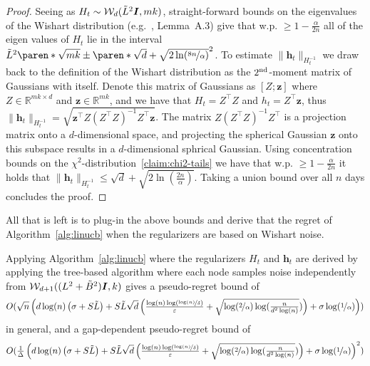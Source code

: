 \documentclass{article}
\renewcommand{\vec}[1]{\bm{#1}}
\newcommand{\Real}{\mathds{R}}
\DeclarePairedDelimiter{\paren}()
\providecommand\transp{\top}
\let\transpsymbol\transp
\renewcommand{\transp}[1]{#1^\transpsymbol}
\newcommand{\Wishart}{\mathcal{W}}
\newcommand{\Eye}[1][]{\bm{I}\notblank{#1}{_{{#1}\times{#1}}}{}}
\begin{document}
\begin{proof}
Seeing as $H_t\sim\Wishart_d(\tilde L^2 \Eye, mk)$, straight-forward bounds on the eigenvalues of the Wishart distribution (e.g.~\cite{SheffetPrivateApproxRegression2015}, Lemma~A.3) give that w.p. $\geq 1- \tfrac \alpha{2n}$ all of the eigen values of $H_t$ lie in the interval $\tilde L^2 \paren*{\sqrt{mk} \pm \paren*{\sqrt{d} + \sqrt{2\ln(\nicefrac{8n}{\alpha})}}}^2$. To estimate $\|\vec h_t\|_{H_t^{-1}}$ we draw back to the definition of the Wishart distribution as the $2^{\rm nd}$-moment matrix of Gaussians with itself. Denote this matrix of Gaussians as $[Z ; \vec z]$ where $Z\in \Real^{mk\times d}$ and $\vec z \in \Real^{mk}$, and we have that $H_t = \transp Z Z$ and $h_t = \transp Z \vec z$, thus $\|\vec h_t\|_{H_t^{-1}} = \sqrt{ \transp{\vec z} Z (\transp Z Z)^{-1}  \transp Z \vec z }$. The matrix $Z (\transp Z Z)^{-1}  \transp Z$ is a projection matrix onto a $d$-dimensional space, and projecting the spherical Gaussian $\vec z$ onto this subspace results in a $d$-dimensional sphrical Gaussian. Using concentration bounds on the $\chi^2$-distribution~\ref{claim:chi2-tails} we have that w.p. $\geq 1- \tfrac \alpha{2n}$ it holds that $\|\vec h_t\|_{H_t^{-1}}\leq \sqrt{d} + \sqrt{2\ln(\tfrac{2n}{\alpha})}$. Taking a union bound over all $n$ days concludes the proof.
\end{proof}

All that is left is to plug-in the above bounds and derive that the regret of Algorithm~\ref{alg:linucb} when the regularizers are based on Wishart noise.
\begin{corollary}
\label{cor:regret_with_Wishart}
Applying Algorithm~\ref{alg:linucb} where the regularizers $H_t$ and $\vec h_t$ are derived by applying the tree-based algorithm where each node samples noise independently from $\Wishart_{d+1}( (L^2+\tilde B^2)\Eye, k )$ gives a pseudo-regret bound of
\[ O(\sqrt n\left( d\log(n)\left( \sigma+S\tilde{L} \right) +S\tilde{L}\sqrt d \left( \tfrac{\log(n)\log(\nicefrac{\log(n)}{\delta})}{\varepsilon} +\sqrt{\log(\nicefrac 2 \alpha)\log(\tfrac{n}{d^2\log(n)}}) \right) +\sigma\log(\nicefrac 1 \alpha) \right) )  \] in general, and a gap-dependent pseudo-regret bound of
\[ O(\tfrac1 \Delta\left( d\log(n)\left( \sigma+S\tilde{L} \right) +S\tilde{L}\sqrt d \left( \tfrac{\log(n)\log(\nicefrac{\log(n)}{\delta})}{\varepsilon} +\sqrt{\log(\nicefrac 2 \alpha)\log(\tfrac{n}{d^2\log(n)}}) \right) +\sigma\log(\nicefrac 1 \alpha) \right)^2 ) \]
\end{corollary}
\end{document}
